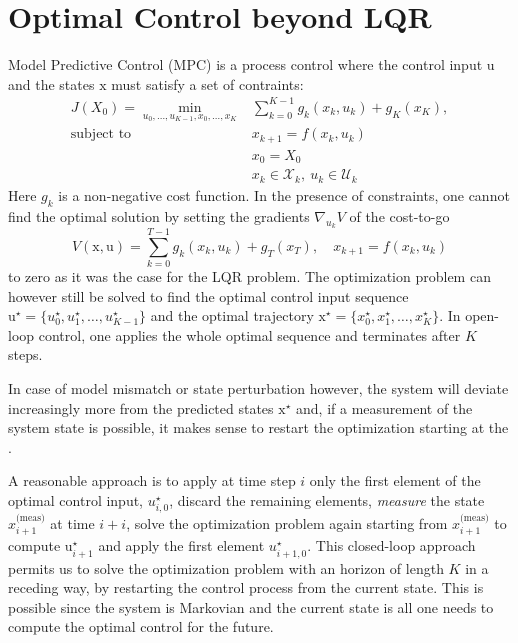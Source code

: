 \documentclass[11pt]{report}
\newcommand{\bs}[1]{\boldsymbol{#1}}
\newcommand{\bsu}{\bs{\mathrm{u}}}
\newcommand{\bsx}{\bs{\mathrm{x}}}
\begin{document}
\chapter{Optimal Control beyond LQR}
\label{sec:optimal-control-beyond-lqr}

Model Predictive Control (MPC) is a process control where the control input $\bsu$ and the states $\bsx$ must satisfy a set of contraints:
\begin{align}
  \label{eq:MPC-general-formulation}
  J(X_0) = \min_{u_0,\ldots,u_{K-1}, x_0,\ldots,x_K} &\sum_{k=0}^{K-1} g_k(x_k,u_k) + g_K(x_K),\\
  \text{subject to } & x_{k+1} = f(x_k,u_k) \\
                                                     & x_0 = X_0 \\
                                                     & x_k \in \mathcal{X}_k,\ u_k \in \mathcal{U}_k
\end{align}
Here $g_k$ is a non-negative cost function. In the presence of constraints, one cannot find the optimal solution by setting the gradients $\nabla_{u_k} V$ of the cost-to-go
\begin{equation*}
  V(\bsx,\bsu) = \sum_{k=0}^{T-1} g_k(x_k,u_k) + g_T(x_T),\quad x_{k+1} = f(x_k,u_k)
\end{equation*}
to zero as it was the case for the LQR problem. The optimization problem can however still be solved to find the optimal control input sequence $\bsu^\star = \{u_0^\star,u_1^\star,\ldots,u_{K-1}^\star\}$ and the optimal trajectory $\bsx^\star = \{x_0^\star,x_1^\star,\ldots,x_K^\star\}$. In open-loop control, one applies the whole optimal sequence and terminates after $K$ steps.

In case of model mismatch or state perturbation however, the system will deviate increasingly more from the predicted states $\bsx^\star$ and, if a measurement of the system state is possible, it makes sense
to restart the optimization starting at the .

A reasonable approach is to apply at time step $i$ only the first element of the optimal control input, $u_{i,0}^\star$, discard the remaining elements, \emph{measure} the state $x_{i+1}^\text{(meas)}$ at time $i+i$, solve the optimization problem again starting from $x_{i+1}^\text{(meas)}$ to compute $\bsu_{i+1}^\star$ and apply the first element $u_{i+1,0}^\star$. This closed-loop approach permits us to solve the optimization problem with an horizon of length $K$ in a receding way, by restarting the control process from the current state. This is possible since the system is Markovian and the current state is all one needs to compute the optimal control for the future.
\end{document}
